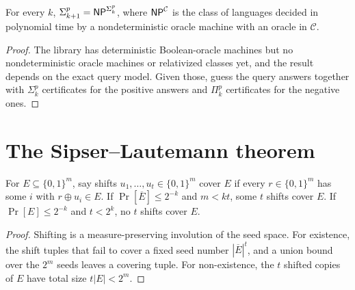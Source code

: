 \begin{theorem}
  \label{thm:randomness-ph-oracle}
  \notready
  For every $k$, $\Sigma^p_{k+1} = \mathsf{NP}^{\Sigma^p_k}$, where
  $\mathsf{NP}^{\mathcal{C}}$ is the class of languages decided in polynomial time
  by a nondeterministic oracle machine with an oracle in $\mathcal{C}$.
\end{theorem}
\begin{proof}
  The library has deterministic Boolean-oracle machines but no
  nondeterministic oracle machines or relativized classes yet, and the result
  depends on the exact query model. Given those, guess the query answers
  together with $\Sigma^p_k$ certificates for the positive answers and
  $\Pi^p_k$ certificates for the negative ones.
\end{proof}

\section{The Sipser--Lautemann theorem}

\begin{lemma}
  \label{lem:randomness-covering}
  \leanok
  For $E \subseteq \{0,1\}^m$, say shifts $u_1, \dots, u_t \in \{0,1\}^m$ cover
  $E$ if every $r \in \{0,1\}^m$ has some $i$ with $r \oplus u_i \in E$. If
  $\Pr[\overline{E}] \le 2^{-k}$ and $m < kt$, some $t$ shifts cover $E$. If
  $\Pr[E] \le 2^{-k}$ and $t < 2^k$, no $t$ shifts cover $E$.
\end{lemma}
\begin{proof}
  \leanok
  Shifting is a measure-preserving involution of the seed space. For
  existence, the shift tuples that fail to cover a fixed seed number
  $|\overline{E}|^t$, and a union bound over the $2^m$ seeds leaves a covering
  tuple. For non-existence, the $t$ shifted copies of $E$ have total size
  $t|E| < 2^m$.
\end{proof}

